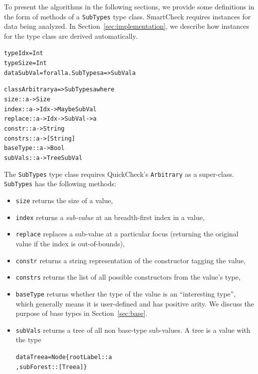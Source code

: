 \documentclass{sigplanconf}
\newenvironment{code}{\begin{alltt}}{\end{alltt}}
\newcommand{\ttp}[1]{\texttt{#1}}
\begin{document}
To present the algorithms in the following sections, we provide some definitions
in the form of methods of a \ttp{SubTypes} type class.  SmartCheck requires
instances for data being analyzed.  In Section~\ref{sec:implementation}, we
describe how instances for the type class are derived automatically.
%
\begin{code}
type Idx    = Int
type Size   = Int
data SubVal = forall a. SubTypes a => SubVal a

class Arbitrary a => SubTypes a where
  size     :: a -> Size
  index    :: a -> Idx -> Maybe SubVal
  replace  :: a -> Idx -> SubVal -> a
  constr   :: a -> String
  constrs  :: a -> [String]
  baseType :: a -> Bool
  subVals  :: a -> Tree SubVal
\end{code}
%
\noindent
The \ttp{SubTypes} type class requires QuickCheck's \ttp{Arbitrary} as a
super-class.  \ttp{SubTypes} has the following methods:
\begin{itemize}
\item \ttp{size} returns the size of a value,
\item \ttp{index} returns a \emph{sub-value} at an breadth-first index in a
  value,
\item \ttp{replace} replaces a sub-value at a particular focus (returning the
  original value if the index is out-of-bounds),
\item \ttp{constr} returns a string representation of the constructor tagging
  the value,
\item \ttp{constrs} returns the list of all possible constructors from the
  value's type,
\item \ttp{baseType} returns whether the type of the value is an ``interesting
  type'', which generally means it is user-defined and has positive arity.
  We discuss the purpose of base types in Section~\ref{sec:base}.
\item \ttp{subVals} returns a tree of all non base-type sub-values.  A tree is a
  value with the type
%
  \begin{code}
data Tree a = Node \{ rootLabel :: a
                   , subForest :: [Tree a] \}
  \end{code}
%
\end{itemize}
\end{document}
